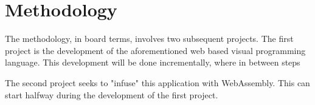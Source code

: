 
\section{Methodology}

The methodology, in board terms, involves two subsequent projects. The first project is the development of the aforementioned web based visual programming language. This development will be done incrementally, where in between steps 

The second project seeks to "infuse" this application with WebAssembly. This can start halfway during the development of the first project. 





% 
% 
